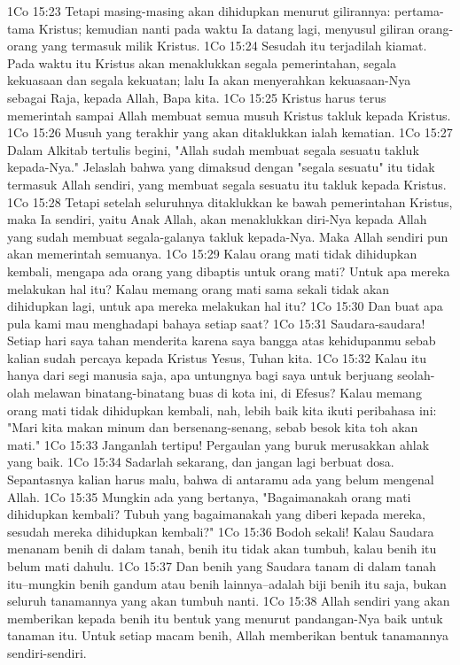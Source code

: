1Co 15:23  Tetapi masing-masing akan dihidupkan menurut gilirannya: pertama-tama Kristus; kemudian nanti pada waktu Ia datang lagi, menyusul giliran orang-orang yang termasuk milik Kristus.
1Co 15:24  Sesudah itu terjadilah kiamat. Pada waktu itu Kristus akan menaklukkan segala pemerintahan, segala kekuasaan dan segala kekuatan; lalu Ia akan menyerahkan kekuasaan-Nya sebagai Raja, kepada Allah, Bapa kita.
1Co 15:25  Kristus harus terus memerintah sampai Allah membuat semua musuh Kristus takluk kepada Kristus.
1Co 15:26  Musuh yang terakhir yang akan ditaklukkan ialah kematian.
1Co 15:27  Dalam Alkitab tertulis begini, "Allah sudah membuat segala sesuatu takluk kepada-Nya." Jelaslah bahwa yang dimaksud dengan "segala sesuatu" itu tidak termasuk Allah sendiri, yang membuat segala sesuatu itu takluk kepada Kristus.
1Co 15:28  Tetapi setelah seluruhnya ditaklukkan ke bawah pemerintahan Kristus, maka Ia sendiri, yaitu Anak Allah, akan menaklukkan diri-Nya kepada Allah yang sudah membuat segala-galanya takluk kepada-Nya. Maka Allah sendiri pun akan memerintah semuanya.
1Co 15:29  Kalau orang mati tidak dihidupkan kembali, mengapa ada orang yang dibaptis untuk orang mati? Untuk apa mereka melakukan hal itu? Kalau memang orang mati sama sekali tidak akan dihidupkan lagi, untuk apa mereka melakukan hal itu?
1Co 15:30  Dan buat apa pula kami mau menghadapi bahaya setiap saat?
1Co 15:31  Saudara-saudara! Setiap hari saya tahan menderita karena saya bangga atas kehidupanmu sebab kalian sudah percaya kepada Kristus Yesus, Tuhan kita.
1Co 15:32  Kalau itu hanya dari segi manusia saja, apa untungnya bagi saya untuk berjuang seolah-olah melawan binatang-binatang buas di kota ini, di Efesus? Kalau memang orang mati tidak dihidupkan kembali, nah, lebih baik kita ikuti peribahasa ini: "Mari kita makan minum dan bersenang-senang, sebab besok kita toh akan mati."
1Co 15:33  Janganlah tertipu! Pergaulan yang buruk merusakkan ahlak yang baik.
1Co 15:34  Sadarlah sekarang, dan jangan lagi berbuat dosa. Sepantasnya kalian harus malu, bahwa di antaramu ada yang belum mengenal Allah.
1Co 15:35  Mungkin ada yang bertanya, "Bagaimanakah orang mati dihidupkan kembali? Tubuh yang bagaimanakah yang diberi kepada mereka, sesudah mereka dihidupkan kembali?"
1Co 15:36  Bodoh sekali! Kalau Saudara menanam benih di dalam tanah, benih itu tidak akan tumbuh, kalau benih itu belum mati dahulu.
1Co 15:37  Dan benih yang Saudara tanam di dalam tanah itu--mungkin benih gandum atau benih lainnya--adalah biji benih itu saja, bukan seluruh tanamannya yang akan tumbuh nanti.
1Co 15:38  Allah sendiri yang akan memberikan kepada benih itu bentuk yang menurut pandangan-Nya baik untuk tanaman itu. Untuk setiap macam benih, Allah memberikan bentuk tanamannya sendiri-sendiri.
